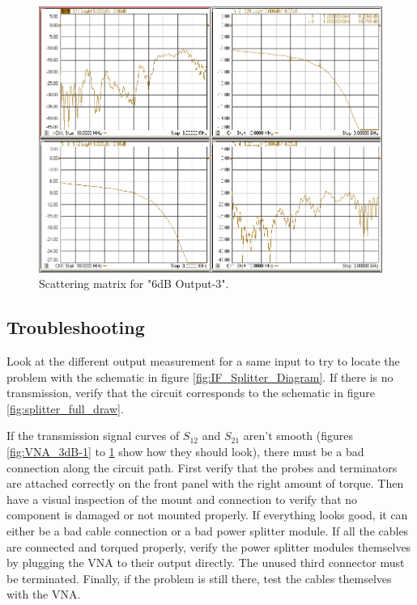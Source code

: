 \documentclass[12pt,a4paper,oneside]{article}
\begin{document}
%
%
\begin{figure}[H]
\centering
\includegraphics[width=0.9\linewidth]{figures/6dB-3.png}
\caption{Scattering matrix for "6dB Output-3".}
\label{fig:VNA_6dB-3}
\end{figure}
%

\subsection{Troubleshooting}
\label{sec:Testing_Troubleshooting}
Look at the different output measurement for a same input to try to locate the problem with the schematic in figure \ref{fig:IF_Splitter_Diagram}. If there is no transmission, verify that the circuit corresponds to the schematic in figure \ref{fig:splitter_full_draw}. 

If the transmission signal curves of $S_{12}$ and $S_{21}$ aren't smooth (figures \ref{fig:VNA_3dB-1} to \ref{fig:VNA_6dB-3} show how they should look), there must be a bad connection along the circuit path. First verify that the probes and terminators are attached correctly on the front panel with the right amount of torque. Then have a visual inspection of the mount and connection to verify that no component is damaged or not mounted properly. If everything looks good, it can either be a bad cable connection or a bad power splitter module. If all the cables are connected and torqued properly, verify the power splitter modules themselves by plugging the VNA to their output directly. The unused third connector must be terminated. Finally, if the problem is still there, test the cables themselves with the VNA.
\newpage
 
\end{document}
